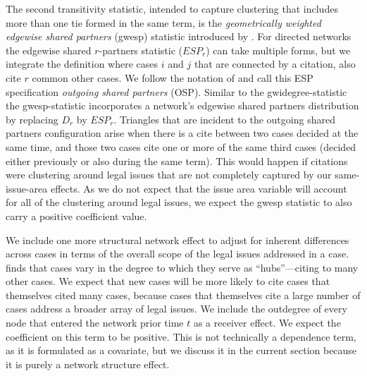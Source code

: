 \documentclass[headsepline=true, abstracton]{scrartcl}
\begin{document}
The second transitivity statistic, intended to capture clustering that includes more than one tie formed in the same term, is the \textit{geometrically weighted edgewise shared partners} (gwesp) statistic introduced by \citet{hunter2006inference}. For directed networks the edgewise shared $r$-partners statistic ($ESP_r$) can take multiple forms, but we integrate the definition where cases $i$ and $j$ that are connected by a citation, also cite $r$ common other cases. We follow the notation of \citet{Butts.2008} and call this ESP specification \textit{outgoing shared partners} (OSP). Similar to the gwidegree-statistic the gwesp-statistic incorporates a network's edgewise shared partners distribution by replacing $D_r$ by $ESP_r$. Triangles that are incident to the outgoing shared partners configuration arise when there is a cite between two cases decided at the same time, and those two cases cite one or more of the same third cases (decided either previously or also during the same term). This would happen if citations were clustering around legal issues that are not completely captured by our same-issue-area effects.  As we do not expect that the issue area variable will account for all of the clustering around legal issues, we expect the gwesp statistic to also carry a positive coefficient value.

We include one more structural network effect to adjust for inherent differences across cases in terms of the overall scope of the legal issues addressed in a case.  \citet{fowler2008authority} finds that cases vary in the degree to which they serve as ``hubs''---citing to many other cases. We expect that new cases will be more likely to cite cases that themselves cited many cases, because cases that themselves cite a large number of cases address a broader array of legal issues. We include the outdegree of every node that entered the network prior time $t$ as a receiver effect. We expect the coefficient on this term to be positive. This is not technically a dependence term, as it is formulated as a covariate, but we discuss it in the current section because it is purely a network structure effect.




\end{document}
